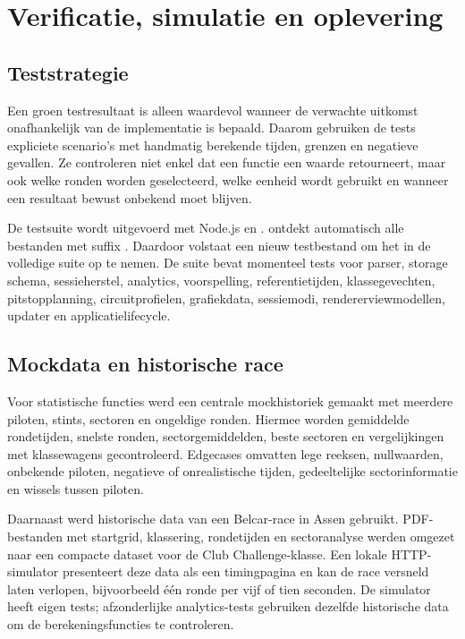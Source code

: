 
\chapter{Verificatie, simulatie en oplevering}
\label{chap:testen}
\section{Teststrategie}
Een groen testresultaat is alleen waardevol wanneer de verwachte uitkomst onafhankelijk van de
implementatie is bepaald. Daarom gebruiken de tests expliciete scenario's met handmatig berekende
tijden, grenzen en negatieve gevallen. Ze controleren niet enkel dat een functie een waarde
retourneert, maar ook welke ronden worden geselecteerd, welke eenheid wordt gebruikt en wanneer een
resultaat bewust onbekend moet blijven.

De testsuite wordt uitgevoerd met Node.js en .  ontdekt
automatisch alle bestanden met suffix . Daardoor volstaat een nieuw testbestand om
het in de volledige suite op te nemen. De suite bevat momenteel tests voor parser, storage schema,
sessieherstel, analytics, voorspelling, referentietijden, klassegevechten, pitstopplanning,
circuitprofielen, grafiekdata, sessiemodi, rendererviewmodellen, updater en applicatielifecycle.

\section{Mockdata en historische race}
Voor statistische functies werd een centrale mockhistoriek gemaakt met meerdere piloten, stints,
sectoren en ongeldige ronden. Hiermee worden gemiddelde rondetijden, snelste ronden,
sectorgemiddelden, beste sectoren en vergelijkingen met klassewagens gecontroleerd. Edgecases
omvatten lege reeksen, nullwaarden, onbekende piloten, negatieve of onrealistische tijden,
gedeeltelijke sectorinformatie en wissels tussen piloten.

Daarnaast werd historische data van een Belcar-race in Assen gebruikt. PDF-bestanden met startgrid,
klassering, rondetijden en sectoranalyse werden omgezet naar een compacte dataset voor de Club
Challenge-klasse. Een lokale HTTP-simulator presenteert deze data als een timingpagina en kan de
race versneld laten verlopen, bijvoorbeeld één ronde per vijf of tien seconden. De simulator heeft
eigen tests; afzonderlijke analytics-tests gebruiken dezelfde historische data om de
berekeningsfuncties te controleren.

